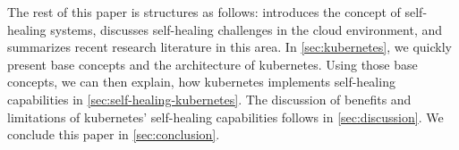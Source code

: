   The rest of this paper is structures as follows:
   introduces the concept of self-healing systems, discusses self-healing challenges in the cloud environment, and summarizes recent research literature in this area.
  In \cref{sec:kubernetes}, we quickly present base concepts and the architecture of \gls{kubernetes}.
  Using those base concepts, we can then explain, how \gls{kubernetes} implements self-healing capabilities in \cref{sec:self-healing-kubernetes}.
  The discussion of benefits and limitations of \gls{kubernetes}' self-healing capabilities follows in \cref{sec:discussion}.
  We conclude this paper in \cref{sec:conclusion}.
